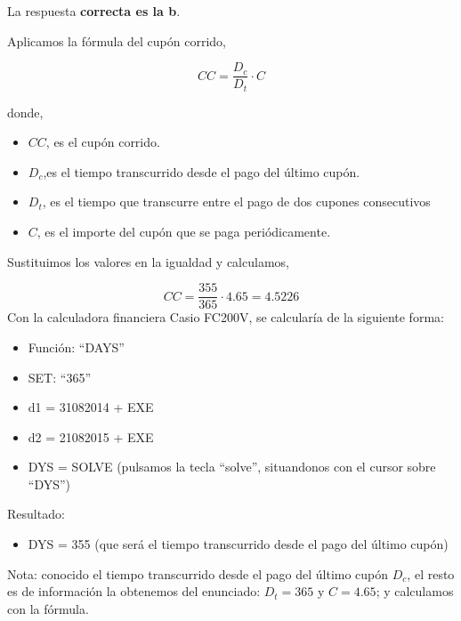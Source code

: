 \documentclass[
  letterpaper,
  DIV=11,
  numbers=noendperiod]{scrreprt}
\providecommand{\tightlist}{%
  \setlength{\itemsep}{0pt}\setlength{\parskip}{0pt}}\usepackage{longtable,booktabs,array}
\begin{document}
\begin{tcolorbox}[enhanced jigsaw, left=2mm, opacityback=0, colback=white, breakable, arc=.35mm, bottomrule=.15mm, rightrule=.15mm, toprule=.15mm, leftrule=.75mm, colframe=quarto-callout-tip-color-frame]
\begin{minipage}[t]{5.5mm}
\textcolor{quarto-callout-tip-color}{\faLightbulb}
\end{minipage}%
\begin{minipage}[t]{\textwidth - 5.5mm}

La respuesta \textbf{correcta es la b}.

Aplicamos la fórmula del cupón corrido,

\[CC=\frac{D_c}{D_t}\cdot C\]

donde,

\begin{itemize}
\item
  \(CC\), es el cupón corrido.
\item
  \(D_{c}\),es el tiempo transcurrido desde el pago del último cupón.
\item
  \(D_{t}\), es el tiempo que transcurre entre el pago de dos cupones
  consecutivos
\item
  \(C\), es el importe del cupón que se paga periódicamente.
\end{itemize}

Sustituimos los valores en la igualdad y calculamos,

\[CC=\frac{355}{365}\cdot 4.65=4.5226\] Con la calculadora financiera
Casio FC200V, se calcularía de la siguiente forma:

\begin{itemize}
\item
  Función: ``DAYS''
\item
  SET: ``365''
\item
  d1 = 31082014 + EXE
\item
  d2 = 21082015 + EXE
\item
  DYS = SOLVE (pulsamos la tecla ``solve'', situandonos con el cursor
  sobre ``DYS'')
\end{itemize}

Resultado:

\begin{itemize}
\tightlist
\item
  DYS = 355 (que será el tiempo transcurrido desde el pago del último
  cupón)
\end{itemize}

Nota: conocido el tiempo transcurrido desde el pago del último cupón
\(D_{c}\), el resto es de información la obtenemos del enunciado:
\(D_{t}=365\) y \(C=4.65\); y calculamos con la fórmula.


\end{minipage}
\end{tcolorbox}
\end{document}
